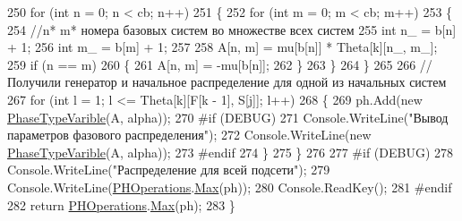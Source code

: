 \begin{DoxyCode}
250                 \textcolor{keywordflow}{for} (\textcolor{keywordtype}{int} n = 0; n < cb; n++)
251                 \{
252                     \textcolor{keywordflow}{for} (\textcolor{keywordtype}{int} m = 0; m < cb; m++)
253                     \{
254                         \textcolor{comment}{//n* m* номера базовых систем во множестве всех систем}
255                         \textcolor{keywordtype}{int} n\_ = b[n] + 1;
256                         \textcolor{keywordtype}{int} m\_ = b[m] + 1;
257 
258                         A[n, m] = mu[b[n]] * Theta[k][n\_, m\_];
259                         \textcolor{keywordflow}{if} (n == m)
260                         \{
261                             A[n, m] = -mu[b[n]];
262                         \}
263                     \}
264                 \}
265 
266                 \textcolor{comment}{//Получили генератор и начальное распределение для одной из начальных систем}
267                 \textcolor{keywordflow}{for} (\textcolor{keywordtype}{int} l = 1; l <= Theta[k][F[k - 1], S[j]]; l++)
268                 \{
269                     ph.Add(\textcolor{keyword}{new} \hyperlink{class_phase_type_distribution_1_1_phase_type_varible}{PhaseTypeVarible}(A, alpha));
270 \textcolor{preprocessor}{#if (DEBUG)
}
271                     Console.WriteLine(\textcolor{stringliteral}{"Вывод параметров фазового распределения"});
272                     Console.WriteLine(\textcolor{keyword}{new} \hyperlink{class_phase_type_distribution_1_1_phase_type_varible}{PhaseTypeVarible}(A, alpha));
273 \textcolor{preprocessor}{#endif
}
274                 \}
275             \}
276 
277 \textcolor{preprocessor}{#if (DEBUG)
}
278             Console.WriteLine(\textcolor{stringliteral}{"Распределение для всей подсети"});
279             Console.WriteLine(\hyperlink{class_phase_type_distribution_1_1_p_h_operations}{PHOperations}.\hyperlink{class_phase_type_distribution_1_1_p_h_operations_a724d142f65c13b43a88d87924f2129bc}{Max}(ph));
280             Console.ReadKey();
281 \textcolor{preprocessor}{#endif
}
282             \textcolor{keywordflow}{return} \hyperlink{class_phase_type_distribution_1_1_p_h_operations}{PHOperations}.\hyperlink{class_phase_type_distribution_1_1_p_h_operations_a724d142f65c13b43a88d87924f2129bc}{Max}(ph);
283         \}
\end{DoxyCode}
